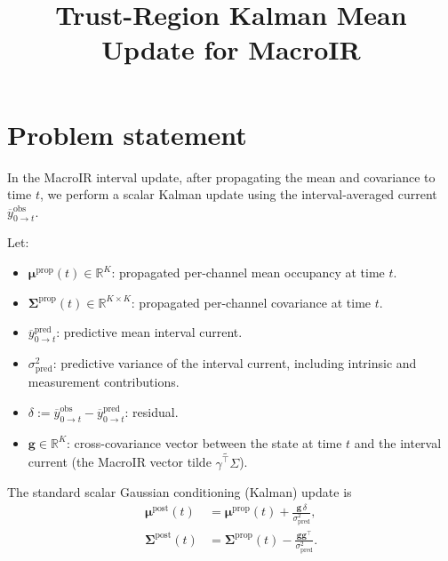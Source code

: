 \documentclass[11pt]{article}
\title{Trust-Region Kalman Mean Update for MacroIR}
\author{}
\date{}
\begin{document}
\maketitle

\newcommand{\E}{\mathbb{E}}
\newcommand{\Var}{\operatorname{Var}}
\newcommand{\Cov}{\operatorname{Cov}}
\newcommand{\diag}{\operatorname{diag}}


\section{Problem statement}

In the MacroIR interval update, after propagating the mean and covariance to
time \(t\), we perform a scalar Kalman update using the interval-averaged
current \(\overline{y}^{\text{obs}}_{0\to t}\).

Let:
\begin{itemize}
  \item \(\boldsymbol{\mu}^{\text{prop}}(t)\in\mathbb{R}^K\): propagated
        per-channel mean occupancy at time \(t\).
  \item \(\boldsymbol{\Sigma}^{\text{prop}}(t)\in\mathbb{R}^{K\times K}\):
        propagated per-channel covariance at time \(t\).
  \item \(\overline{y}^{\text{pred}}_{0\to t}\): predictive mean interval
        current.
  \item \(\sigma^2_{\text{pred}}\): predictive variance of the interval
        current, including intrinsic and measurement contributions.
  \item \(\delta := \overline{y}^{\text{obs}}_{0\to t} -
        \overline{y}^{\text{pred}}_{0\to t}\): residual.
  \item \(\mathbf{g} \in \mathbb{R}^K\): cross-covariance vector between the
        state at time \(t\) and the interval current
        (the MacroIR vector tilde \(\widetilde{\gamma^\top\Sigma}\)).
\end{itemize}

The standard scalar Gaussian conditioning (Kalman) update is
\begin{align}
  \boldsymbol{\mu}^{\text{post}}(t)
  &=
  \boldsymbol{\mu}^{\text{prop}}(t)
  +
  \frac{\mathbf{g}\,\delta}{\sigma^2_{\text{pred}}},
  \label{eq:std-mean-update}
  \\
  \boldsymbol{\Sigma}^{\text{post}}(t)
  &=
  \boldsymbol{\Sigma}^{\text{prop}}(t)
  -
  \frac{\mathbf{g}\mathbf{g}^\top}{\sigma^2_{\text{pred}}}.
  \label{eq:std-cov-update}
\end{align}
\end{document}
